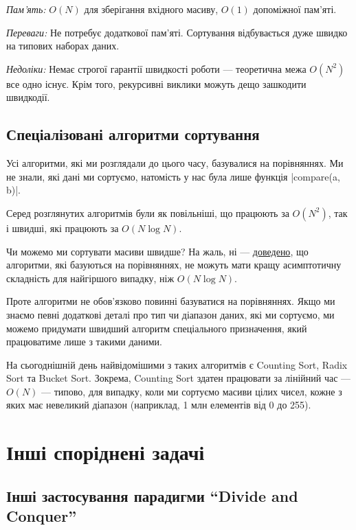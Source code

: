 \documentclass[12pt,a4paper]{report}
\begin{document}
\emph{Пам’ять:} \(O(N)\) для зберігання вхідного масиву, \(O(1)\) допоміжної пам’яті.

\emph{Переваги:} Не потребує додаткової пам’яті. Сортування відбувається дуже швидко на типових наборах даних.

\emph{Недоліки:} Немає строгої гарантії швидкості роботи --- теоретична межа \(O(N^2)\) все одно існує. Крім того, рекурсивні виклики можуть дещо зашкодити швидкодії.


\subsection{Спеціалізовані алгоритми сортування}

Усі алгоритми, які ми розглядали до цього часу, базувалися на порівняннях. Ми не знали, які дані ми сортуємо, натомість у нас була лише функція |compare(a, b)|.

Серед розглянутих алгоритмів були як повільніші, що працюють за \(O(N^2)\), так і швидші, які працюють за \(O(N \log N)\).

Чи можемо ми сортувати масиви швидше? На жаль, ні --- \href{http://www.bowdoin.edu/~ltoma/teaching/cs231/fall07/Lectures/sortLB.pdf}{доведено}, що алгоритми, які базуються на порівняннях, не можуть мати кращу асимптотичну складність для найгіршого випадку, ніж \(O(N \log N)\).

Проте алгоритми не обов’язково повинні базуватися на порівняннях. Якщо ми знаємо певні додаткові деталі про тип чи діапазон даних, які ми сортуємо, ми можемо придумати швидший алгоритм спеціального призначення, який працюватиме лише з такими даними.

На сьогоднішній день найвідомішими з таких алгоритмів є Counting Sort, Radix Sort та Bucket Sort. Зокрема, Counting Sort здатен працювати за лінійний час --- \(O(N)\) --- типово, для випадку, коли ми сортуємо масиви цілих чисел, кожне з яких має невеликий діапазон (наприклад, 1 млн елементів від 0 до 255).



\section{Інші споріднені задачі}

\subsection{Інші застосування парадигми ``Divide and Conquer''}
\end{document}

